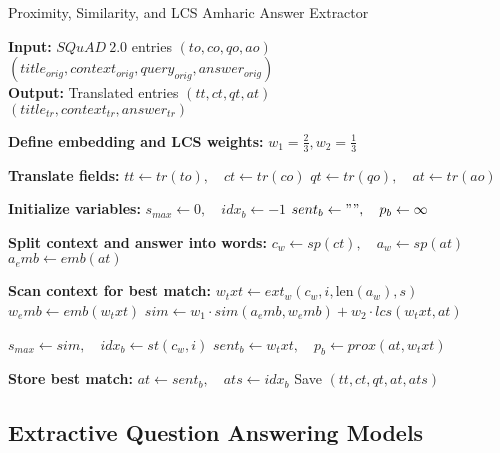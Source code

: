 \begin{algorithm}[H]
\small
\caption{Proximity, Similarity, and LCS Amharic Answer Extractor}
\textbf{Input:} \( SQuAD\ 2.0 \) entries \( (to, co, qo, ao) \) \\ 
\( (title_{orig}, context_{orig}, query_{orig}, answer_{orig}) \)\\
\textbf{Output:} Translated entries \( (tt, ct, qt, at) \)\\
\( (title_{tr}, context_{tr}, answer_{tr}) \)

\begin{algorithmic}[1]
\State \textbf{Define embedding and LCS weights:} \( w_1 = \frac{2}{3}, w_2 = \frac{1}{3} \)

    \State \textbf{Translate fields:}
    \State \( tt \gets tr(to), \quad ct \gets tr(co) \)
    \State \( qt \gets tr(qo), \quad at \gets tr(ao) \)

    \Statex \textbf{Initialize variables:}
    \State \( s_{max} \gets 0, \quad idx_b \gets -1 \)
    \State \( sent_b \gets "", \quad p_b \gets \infty \)

    \Statex \textbf{Split context and answer into words:}
    \State \( c_w \gets sp(ct), \quad a_w \gets sp(at) \)
    \State \( a_emb \gets emb(at) \)

    \Statex \textbf{Scan context for best match:}
         
            \State \( w_txt \gets ext_w(c_w, i, \text{len}(a_w), s) \)
            \State \( w_emb \gets emb(w_txt) \)
            \State \( sim \gets w_1 \cdot sim(a_emb, w_emb) + w_2 \cdot lcs(w_txt, at) \)

                    \State \( s_{max} \gets sim, \quad idx_b \gets st(c_w, i) \)
                    \State \( sent_b \gets w_txt, \quad p_b \gets prox(at, w_txt) \)
                \EndIf
            \EndIf
        \EndFor
    \EndFor

    \Statex \textbf{Store best match:}
    \State \( at \gets sent_b, \quad ats \gets idx_b \)
    \State Save \( (tt, ct, qt, at, ats) \)
\EndFor
\end{algorithmic}
\end{algorithm}





\subsection{Extractive Question Answering Models}

